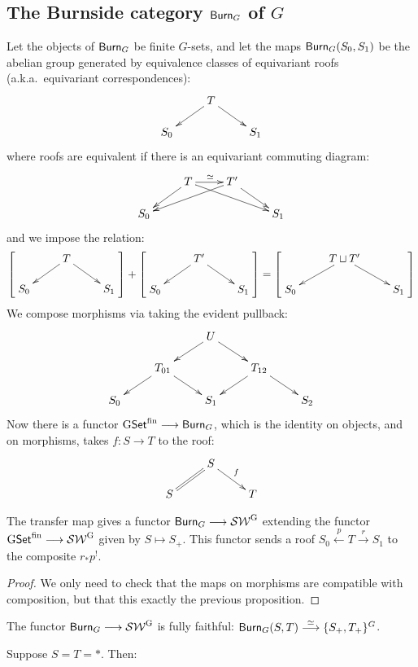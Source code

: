 \documentclass[11pt]{article}
\begin{document}
\begin{ThirdWeek}
\subsection*{The Burnside category $\operatorname{{\mathsf{Burn}}}_G$ of $G$}
Let the objects of $\operatorname{{\mathsf{Burn}}}_G$ be finite $G$-sets, and let the maps $\operatorname{{\mathsf{Burn}}}_G(S_0,S_1)$ be the abelian group generated by equivalence classes of equivariant roofs (a.k.a.\ equivariant correspondences):
\[\xymatrix@R=5mm{&T\ar[dl]\ar[dr]\\S_0&&S_1}\]
where roofs are equivalent if there is an equivariant commuting diagram:
\[\xymatrix@R=5mm{&T\ar[dl]\ar[drr]\ar[r]^\simeq&T'\ar[dll]\ar[dr]
\\S_0&&&S_1}\]
and we impose the relation:
\[
\left[\raisebox{.5cm}[.8cm][0cm] {$\xymatrix@R=5mm{&T\ar[dl]\ar[dr]\\S_0&&S_1}$}\right]
+
\left[\raisebox{.5cm}[.8cm][0cm] {$\xymatrix@R=5mm{&T'\ar[dl]\ar[dr]\\S_0&&S_1}$}\right]
=\left[\raisebox{.5cm}[.8cm][0cm] {$\xymatrix@R=5mm{&T\sqcup T'\ar[dl]\ar[dr]\\S_0&&S_1}$}\right]
\]
We compose morphisms via taking the evident pullback:
\[\xymatrix@R=5mm{
&&U\ar[dl]\ar[dr]\\
&T_{01}\ar[dl]\ar[dr]&&T_{12}\ar[dl]\ar[dr]\\
S_0&&S_1&&S_2
}\]
Now there is a functor $\operatorname{{G\mathsf{Set}^\textup{fin}}}\longrightarrow\operatorname{{\mathsf{Burn}}}_G$, which is the identity on objects, and on morphisms, takes $f:S\to T$ to the roof:
\[\xymatrix@R=5mm{&S\ar@{=}[dl]\ar[dr]^f\\S&&T}\]
\begin{prop*}
The transfer map gives a functor $\operatorname{{\mathsf{Burn}}}_G\longrightarrow\operatorname{{\mathcal{SW}^G}}$ extending the functor $\operatorname{{G\mathsf{Set}^\textup{fin}}}\longrightarrow\operatorname{{\mathcal{SW}^G}}$ given by $S\mapsto S_+$. This functor sends a roof $S_0\overset{p}{\longleftarrow} T\overset{r}{\longrightarrow}S_1$ to the composite $r_* p^!$.
\end{prop*}
\begin{proof}
We only need to check that the maps on morphisms are compatible with composition, but that this exactly the previous proposition.
\end{proof}
\begin{thm*}
The functor $\operatorname{{\mathsf{Burn}}}_G\longrightarrow \operatorname{{\mathcal{SW}^G}}$ is fully faithful: $\operatorname{{\mathsf{Burn}}}_G(S,T)\overset{\simeq}{\longrightarrow}\{S_+,T_+\}^G$.
\end{thm*}
\begin{exmp*}
Suppose $S=T=*$. Then:

\end{exmp*}
\end{ThirdWeek}
\end{document}
